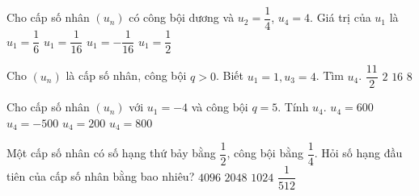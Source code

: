 \begin{ex}%
	Cho cấp số nhân  $(u_n)$ có công bội dương và $u_2=\dfrac{1}{4}$, $u_4=4$. Giá trị của $u_1$ là
	 \choice
		{$u_1=\dfrac{1}{6}$} 
		{\True  $u_1=\dfrac{1}{16}$}
		 {$u_1=-\dfrac{1}{16}$}
		 {$u_1=\dfrac{1}{2}$}
\end{ex}

\begin{ex}%
	Cho $\left(u_n \right)$ là cấp số nhân, công bội $q>0$. Biết $u_1=1,  u_3=4$. Tìm $u_4$.
	 \choice
		{$\dfrac{11}{2}$} 
		 {$2$}
		 {$16$}
		{\True  $8$}
\end{ex}

\begin{ex}%
	Cho cấp số nhân $\left(u_n\right)$ với  $u_1=-4$ và công bội $q=5$. Tính $u_4$.
	 \choice
		{$u_4=600$} 
		 {\True $u_4=-500$}
		 {$u_4=200$}
		{$u_4=800$} 
\end{ex}

\begin{ex}%
	Một cấp số nhân có số hạng thứ bảy bằng $\dfrac{1}{2}$, công  bội bằng $\dfrac{1}{4}$. Hỏi số hạng đầu tiên của cấp số nhân bằng bao nhiêu?
	 \choice
		 {$4096$}
		{\True  $2048$}
		 {$1024$}
		{$\dfrac{1}{512}$} 
\end{ex}

